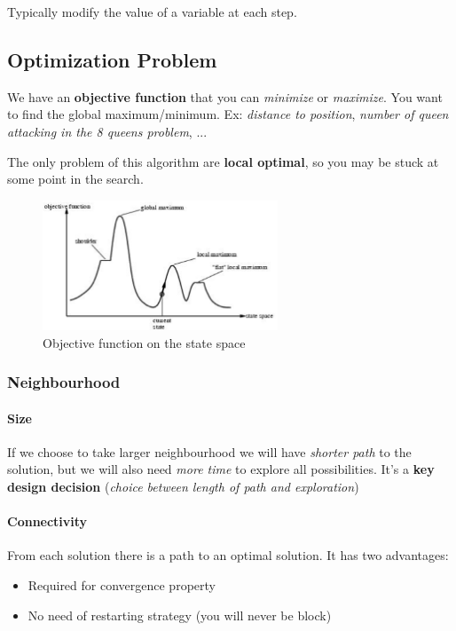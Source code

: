 Typically modify the value of a variable at each step.

\subsection{Optimization Problem}

We have an \textbf{objective function} that you can \textit{minimize} or
\textit{maximize}.  You want  to  find the  global maximum/minimum.  Ex:
\textit{distance to position}, \textit{number  of queen attacking in the
8 queens problem}, ...

The only  problem of this  algorithm are \textbf{local optimal},  so you
may be stuck at some point in the search.

\begin{figure}[h]
    \centering
    \includegraphics[width=7cm]{local.png}
    \caption{Objective function on the state space}
\end{figure}

\subsubsection{Neighbourhood}

\paragraph{Size} 
If we choose  to take larger neighbourhood we  will have \textit{shorter
path}  to the  solution, but  we will  also need  \textit{more time}  to
explore all possibilities. It's a \textbf{key design decision} (\textit{choice
between length of path and exploration})

\paragraph{Connectivity}

From each solution  there is a path  to an optimal solution.  It has two
advantages:
\begin{itemize}
    \item Required for convergence property
    \item No need of restarting strategy (you will never be block)
\end{itemize}


